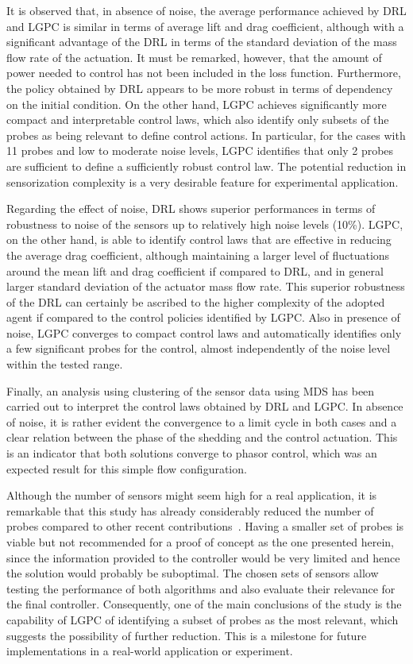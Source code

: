 It is observed that, in absence of noise, the average performance achieved by DRL and LGPC is similar in terms of average lift and drag coefficient, although with a significant advantage of the DRL in terms of the standard deviation of the mass flow rate of the actuation. It must be remarked, however, that the amount of power needed to control has not been included in the loss function. Furthermore, the policy obtained by DRL appears to be more robust in terms of dependency on the initial condition. On the other hand, LGPC achieves significantly more compact and interpretable control laws, which also identify only subsets of the probes as being relevant to define control actions. In particular, for the cases with 11 probes and low to moderate noise levels, LGPC identifies that only 2 probes are sufficient to define a sufficiently robust control law. The potential reduction in sensorization complexity is a very desirable feature for experimental application. 

Regarding the effect of noise, DRL shows superior performances in terms of robustness to noise of the sensors up to relatively high noise levels (10\%). LGPC, on the other hand, is able to identify control laws that are effective in reducing the average drag coefficient, although maintaining a larger level of fluctuations around the mean lift and drag coefficient if compared to DRL, and in general larger standard deviation of the actuator mass flow rate. This superior robustness of the DRL can certainly be ascribed to the higher complexity of the adopted agent if compared to the control policies identified by LGPC. Also in presence of noise, LGPC converges to compact control laws and automatically identifies only a few significant probes for the control, almost independently of the noise level within the tested range.

Finally, an analysis using clustering of the sensor data using MDS has been carried out to interpret the control laws obtained by DRL and LGPC. In absence of noise, it is rather evident the convergence to a limit cycle in both cases and a clear relation between the phase of the shedding and the control actuation. This is an indicator that both solutions converge to phasor control, which was an expected result for this simple flow configuration. 

Although the number of sensors might seem high for a real application, it is remarkable that this study has already considerably reduced the number of probes compared to other recent contributions~\citep{Ren2021pof,rabault2019DRL,rabault2019JFM}. Having a smaller set of probes is viable but not recommended for a proof of concept as the one presented herein, since the information provided to the controller would be very limited and hence the solution would probably be suboptimal. The chosen sets of sensors allow testing the performance of both algorithms and also evaluate their relevance for the final controller. Consequently, one of the main conclusions of the study is the capability of LGPC of identifying a subset of probes as the most relevant, which suggests the possibility of further reduction. This is a milestone for future implementations in a real-world application or experiment.

